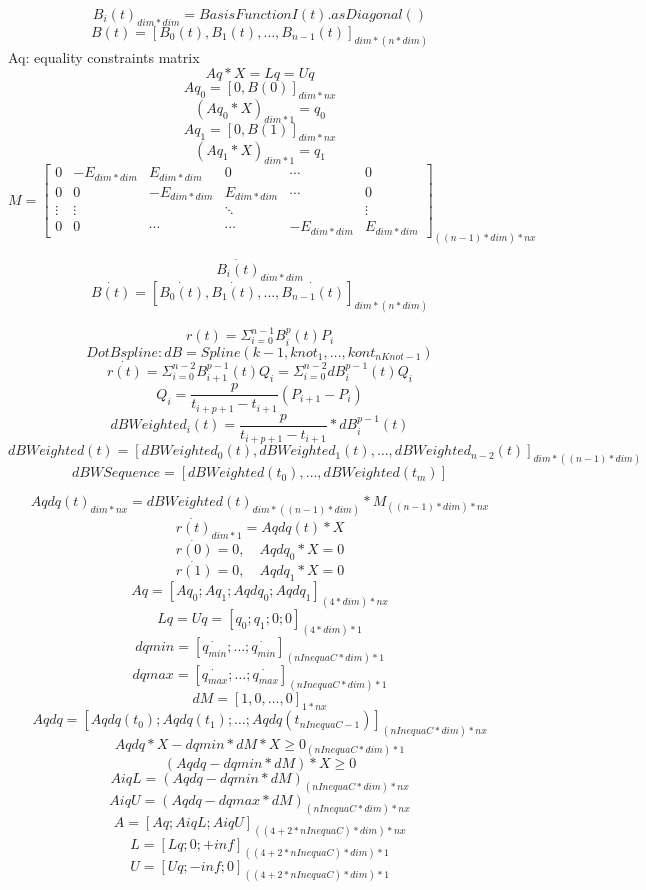 \documentclass[]{article}
\begin{document}
    \[B_{i}(t)_{dim * dim} =  BasisFunctionI(t).asDiagonal()\]
    \[B(t) = [B_{0}(t), B_{1}(t), \ldots, B_{n - 1}(t)]_{dim * (n * dim)} \]
    Aq: equality constraints matrix \\
    \[Aq * X = Lq = Uq \]
    \[ Aq_{0} = [0, B(0)]_{dim * nx} \]
    \[ (Aq_{0} * X)_{dim * 1} = q_{0} \]
    \[ Aq_{1} = [0, B(1)]_{dim * nx} \]
    \[ (Aq_{1} * X)_{dim * 1} = q_{1} \]
    \[ M = \begin{bmatrix}
        0 & -E_{dim * dim} & E_{dim * dim} & 0 & \cdots & 0 \\
        0 & 0 & -E_{dim * dim} & E_{dim * dim} & \cdots & 0 \\
        \vdots &  \vdots & & \ddots & & \vdots \\
        0 & 0 & \cdots &\cdots &-E_{dim * dim} & E_{dim * dim}
    \end{bmatrix}_{((n - 1) * dim) * nx} \]

    \[ \dot{B_i(t)}_{dim * dim}\]
    \[ \dot{B(t)} =  [\dot{B_{0}(t)}, \dot{B_{1}(t)}, \ldots, \dot{B_{n - 1}(t)}]_{dim * (n * dim)} \]
    
    
    \[ r(t) = \Sigma_{i = 0}^{n - 1}B_{i}^{p}(t)P_{i} \]
    \[ DotBspline: dB = Spline(k - 1, {knot_1,\dots, kont_{nKnot - 1}}) \]
    \[ \dot{r(t)} = \Sigma_{i = 0}^{n - 2}B_{i + 1}^{p - 1}(t)Q_{i} = \Sigma_{i = 0}^{n - 2}dB_{i}^{p - 1}(t)Q_{i} \]
    \[ Q_{i} = \frac{p}{t_{i + p + 1} - t_{i + 1}}(P_{i + 1} - P_{i}) \]
    \[ dBWeighted_{i}(t) = \frac{p}{t_{i + p + 1} - t_{i + 1}} * dB_{i}^{p - 1}(t) \]
    \[ dBWeighted(t) =  [dBWeighted_{0}(t), dBWeighted_{1}(t), \ldots, dBWeighted_{n - 2}(t)]_{dim * ((n - 1) * dim)} \]
    \[ dBWSequence = [dBWeighted(t_0), \dots, dBWeighted(t_m)] \]

    \[ Aqdq(t)_{dim * nx} = dBWeighted(t)_{dim * ((n - 1) * dim)} * M_{((n - 1) * dim) * nx} \]
    \[ \dot{r(t)}_{dim * 1} = Aqdq(t) * X \]
    \[ \dot{r(0)} = 0,\quad Aqdq_{0} * X = 0 \]
    \[ \dot{r(1)} = 0,\quad Aqdq_{1} * X = 0 \]
    \[ Aq = [Aq_{0}; Aq_{1}; Aqdq_{0}; Aqdq_{1}]_{(4 * dim) * nx} \]
    \[ Lq = Uq = [q_{0}; q_{1}; 0; 0]_{(4 * dim) * 1} \]
    \[ dqmin = [\dot{q_{min}}; \ldots; \dot{q_{min}}]_{(nInequaC * dim) * 1} \]
    \[ dqmax = [\dot{q_{max}}; \ldots; \dot{q_{max}}]_{(nInequaC * dim) * 1} \]
    \[ dM = [1, 0, \ldots, 0]_{1 * nx} \]
    \[ Aqdq = [Aqdq(t_{0}); Aqdq(t_{1}); \ldots; Aqdq(t_{nInequaC - 1})]_{(nInequaC * dim) * nx} \]
    \[ Aqdq * X - dqmin * dM * X \geq 0_{(nInequaC * dim)*1} \]
    \[ (Aqdq - dqmin * dM) * X \geq 0 \]
    \[ AiqL = (Aqdq - dqmin * dM)_{(nInequaC * dim) * nx} \]
    \[ AiqU = (Aqdq - dqmax * dM)_{(nInequaC * dim) * nx} \]
    \[ A = [Aq; AiqL; AiqU]_{((4 + 2 * nInequaC) * dim) * nx}\]
    \[ L = [Lq; 0; +inf]_{((4 + 2 * nInequaC) * dim) * 1}\]
    \[ U = [Uq; -inf; 0]_{((4 + 2 * nInequaC) * dim) * 1}\]
\end{document}
